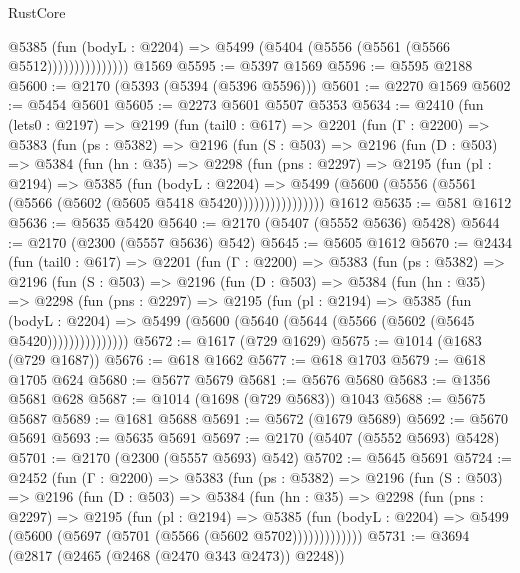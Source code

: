 \begin{lexlean}{RustCore}
\begin{coremodule}
                      @5385
                        (fun (bodyL : @2204) =>
                        @5499 (@5404 (@5556 (@5561 (@5566 @5512)))))))))))))))
    @1569
@5595 := @5397 @1569
@5596 := @5595 @2188
@5600 := @2170 (@5393 (@5394 (@5396 @5596)))
@5601 := @2270 @1569
@5602 := @5454 @5601
@5605 := @2273 @5601 @5507 @5353
@5634 := @2410
    (fun (lets0 : @2197) =>
    @2199
      (fun (tail0 : @617) =>
      @2201
        (fun (Γ : @2200) =>
        @5383
          (fun (ps : @5382) =>
          @2196
            (fun (S : @503) =>
            @2196
              (fun (D : @503) =>
              @5384
                (fun (hn : @35) =>
                @2298
                  (fun (pns : @2297) =>
                  @2195
                    (fun (pl : @2194) =>
                    @5385
                      (fun (bodyL : @2204) =>
                      @5499 (@5600 (@5556 (@5561 (@5566 (@5602 (@5605 @5418 @5420))))))))))))))))
    @1612
@5635 := @581 @1612
@5636 := @5635 @5420
@5640 := @2170 (@5407 (@5552 @5636) @5428)
@5644 := @2170 (@2300 (@5557 @5636) @542)
@5645 := @5605 @1612
@5670 := @2434
    (fun (tail0 : @617) =>
    @2201
      (fun (Γ : @2200) =>
      @5383
        (fun (ps : @5382) =>
        @2196
          (fun (S : @503) =>
          @2196
            (fun (D : @503) =>
            @5384
              (fun (hn : @35) =>
              @2298
                (fun (pns : @2297) =>
                @2195
                  (fun (pl : @2194) =>
                  @5385
                    (fun (bodyL : @2204) =>
                    @5499 (@5600 (@5640 (@5644 (@5566 (@5602 (@5645 @5420)))))))))))))))
@5672 := @1617 (@729 @1629)
@5675 := @1014 (@1683 (@729 @1687))
@5676 := @618 @1662
@5677 := @618 @1703
@5679 := @618 @1705 @624
@5680 := @5677 @5679
@5681 := @5676 @5680
@5683 := @1356 @5681 @628
@5687 := @1014 (@1698 (@729 @5683)) @1043
@5688 := @5675 @5687
@5689 := @1681 @5688
@5691 := @5672 (@1679 @5689)
@5692 := @5670 @5691
@5693 := @5635 @5691
@5697 := @2170 (@5407 (@5552 @5693) @5428)
@5701 := @2170 (@2300 (@5557 @5693) @542)
@5702 := @5645 @5691
@5724 := @2452
    (fun (Γ : @2200) =>
    @5383
      (fun (ps : @5382) =>
      @2196
        (fun (S : @503) =>
        @2196
          (fun (D : @503) =>
          @5384
            (fun (hn : @35) =>
            @2298
              (fun (pns : @2297) =>
              @2195
                (fun (pl : @2194) =>
                @5385
                  (fun (bodyL : @2204) =>
                  @5499 (@5600 (@5697 (@5701 (@5566 (@5602 @5702)))))))))))))
@5731 := @3694 (@2817 (@2465 (@2468 (@2470 @343 @2473)) @2248))

\end{coremodule}
\end{lexlean}
